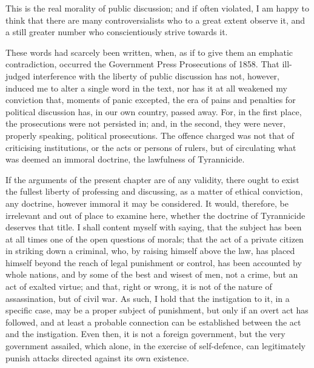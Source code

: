 This is the real morality of public discussion; and if often violated, I am happy to think that there are many controversialists who to a great extent observe it, and a still greater number who conscientiously strive towards it.\par


\begin{readnote}
[6] These words had scarcely been written, when, as if to give them an emphatic contradiction, occurred the Government Press Prosecutions of 1858. That ill-judged interference with the liberty of public discussion has not, however, induced me to alter a single word in the text, nor has it at all weakened my conviction that, moments of panic excepted, the era of pains and penalties for political discussion has, in our own country, passed away. For, in the first place, the prosecutions were not persisted in; and, in the second, they were never, properly speaking, political prosecutions. The offence charged was not that of criticising institutions, or the acts or persons of rulers, but of circulating what was deemed an immoral doctrine, the lawfulness of Tyrannicide.
\end{readnote}

\begin{readnote}
If the arguments of the present chapter are of any validity, there ought to exist the fullest liberty of professing and discussing, as a matter of ethical conviction, any doctrine, however immoral it may be considered. It would, therefore, be irrelevant and out of place to examine here, whether the doctrine of Tyrannicide deserves that title. I shall content myself with saying, that the subject has been at all times one of the open questions of morals; that the act of a private citizen in striking down a criminal, who, by raising himself above the law, has placed himself beyond the reach of legal punishment or control, has been accounted by whole nations, and by some of the best and wisest of men, not a crime, but an act of exalted virtue; and that, right or wrong, it is not of the nature of assassination, but of civil war. As such, I hold that the instigation to it, in a specific case, may be a proper subject of punishment, but only if an overt act has followed, and at least a probable connection can be established between the act and the instigation. Even then, it is not a foreign government, but the very government assailed, which alone, in the exercise of self-defence, can legitimately punish attacks directed against its own existence.
\end{readnote}

